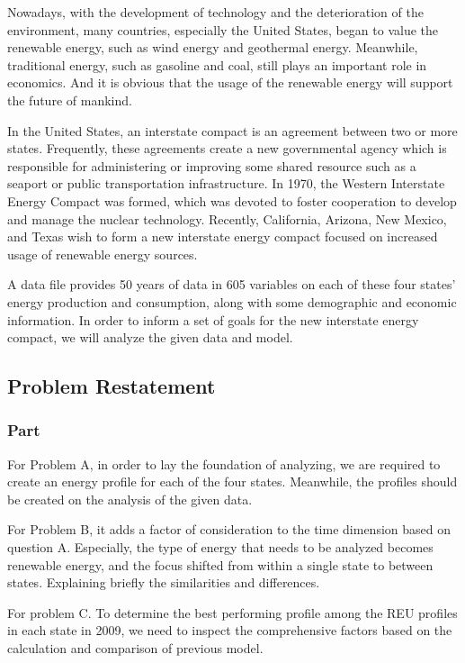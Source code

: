 \documentclass[a4paper,11pt]{article}
\begin{document}
\par Nowadays, with the development of technology and the deterioration of the environment, many countries, especially the United States, began to value the renewable energy, such as wind energy and geothermal energy. Meanwhile, traditional energy, such as gasoline and coal, still plays an important role in economics. And it is obvious that the usage of the renewable energy will support the future of mankind.
\par In the United States, an interstate compact is an agreement between two or more states. Frequently, these agreements create a new governmental agency which is responsible for administering or improving some shared resource such as a seaport or public transportation infrastructure.\cite{1} In 1970, the Western Interstate Energy Compact was formed, which was devoted to foster cooperation to develop and manage the nuclear technology. Recently, California, Arizona, New Mexico, and Texas wish to form a new interstate energy compact focused on increased usage of renewable energy sources. 
\par A data file provides 50 years of data in 605 variables on each of these four states' energy production and consumption, along with some demographic and economic information. In order to inform a set of goals for the new interstate energy compact, we will analyze the given data and model.


\subsection{Problem Restatement}
\subsubsection*{Part \uppercase\expandafter{}}
\par For Problem A, in order to lay the foundation of analyzing, we are required to create an energy profile for each of the four states. Meanwhile, the profiles should be created on the analysis of the given data.

\par For Problem B, it adds a factor of consideration to the time dimension based on question A. Especially, the type of energy that needs to be analyzed becomes renewable energy, and the focus shifted from within a single state to between states. Explaining briefly the similarities and differences.

\par For problem C. To determine the best performing profile among the REU profiles in each state in 2009, we need to inspect the comprehensive factors based on the calculation and comparison of previous model.
\end{document}
